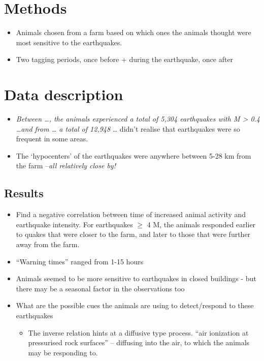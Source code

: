 \documentclass[
]{book}
\providecommand{\tightlist}{%
  \setlength{\itemsep}{0pt}\setlength{\parskip}{0pt}}
\begin{document}
\hypertarget{methods-1}{%
\section{Methods}\label{methods-1}}

\begin{itemize}
\item
  Animals chosen from a farm based on which ones the animals thought were most sensitive to the earthquakes.
\item
  Two tagging periods, once before + during the earthquake, once after
\end{itemize}

\hypertarget{data-description}{%
\section{Data description}\label{data-description}}

\begin{itemize}
\item
  \emph{Between \ldots, the animals experienced a total of 5,304 earthquakes with M \textgreater{} 0.4 \ldots and from \ldots{} a total of 12,948} \ldots{} didn't realise that earthquakes were so frequent in some areas.
\item
  The `hypocenters' of the earthquakes were anywhere between 5-28 km from the farm --\emph{all relatively close by!}
\end{itemize}

\hypertarget{results-1}{%
\subsection{Results}\label{results-1}}

\begin{itemize}
\item
  Find a negative correlation between time of increased animal activity and earthquake intensity. For earthquakes \(\geq\) 4 M, the animals responded earlier to quakes that were closer to the farm, and later to those that were further away from the farm.
\item
  ``Warning times'' ranged from 1-15 hours
\item
  Animals seemed to be more sensitive to earthquakes in closed buildings - but there may be a seasonal factor in the observations too
\item
  What are the possible cues the animals are using to detect/respond to these earthquakes

  \begin{itemize}
  \tightlist
  \item
    The inverse relation hints at a diffusive type process. ``air ionization at pressurised rock surfaces'' -- diffusing into the air, to which the animals may be responding to.
  \end{itemize}
\end{itemize}
\end{document}
